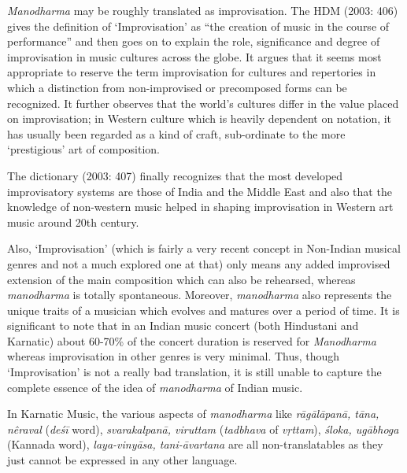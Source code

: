 \textit{Manodharma} may be roughly translated as improvisation. The HDM (2003: 406) gives the definition of ‘Improvisation’ as “the creation of music in the course of performance” and then goes on to explain the role, significance and degree of improvisation in music cultures across the globe. It argues that it seems most appropriate to reserve the term improvisation for cultures and repertories in which a distinction from non-improvised or precomposed forms can be recognized. It further observes that the world’s cultures differ in the value placed on improvisation; in Western culture which is heavily dependent on notation, it has usually been regarded as a kind of craft, sub-ordinate to the more ‘prestigious’ art of composition.

The dictionary (2003: 407) finally recognizes that the most developed improvisatory systems are those of India and the Middle East and also that the knowledge of non-western music helped in shaping improvisation in Western art music around 20th century.

Also, ‘Improvisation’ (which is fairly a very recent concept in Non-Indian musical genres and not a much explored one at that) only means any added improvised extension of the main composition which can also be rehearsed, whereas \textit{manodharma} is totally spontaneous. Moreover, \textit{manodharma} also represents the unique traits of a musician which evolves and matures over a period of time. It is significant to note that in an Indian music concert (both Hindustani and Karnatic) about 60-70\% of the concert duration is reserved for \textit{Manodharma} whereas improvisation in other genres is very minimal. Thus, though ‘Improvisation’ is not a really bad translation, it is still unable to capture the complete essence of the idea of \textit{manodharma} of Indian music.

In Karnatic Music, the various aspects of \textit{manodharma} like \textit{rāgālāpanā, tāna, nêraval} (\textit{deśī} word), \textit{svarakalpanā, viruttam} (\textit{tadbhava} of \textit{vṛttam}), \textit{śloka, ugābhoga} (Kannada word), \textit{laya-vinyāsa, tani-āvartana} are all non-translatables as they just cannot be expressed in any other language.


